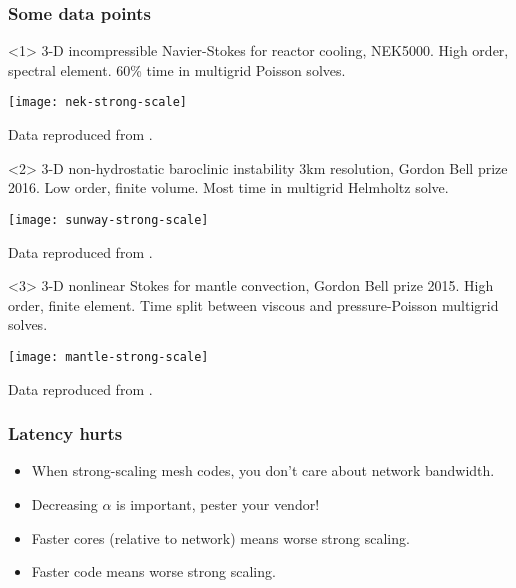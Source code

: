 \documentclass[presentation]{beamer}
\begin{document}
\begin{frame}
  \frametitle{Some data points}

  \begin{onlyenv}<1>
    3-D incompressible Navier-Stokes for reactor cooling, NEK5000.
    High order, spectral element.  60\% time in multigrid Poisson solves.

    \begin{center}
      \texttt{[image: nek-strong-scale]}

      Data reproduced from \textcite{Fischer:2015}.
    \end{center}
  \end{onlyenv}

  \begin{onlyenv}<2>
    3-D non-hydrostatic baroclinic instability 3km resolution, Gordon Bell prize
    2016.  Low order, finite volume. Most time in multigrid Helmholtz solve.
    \begin{center}
      \texttt{[image: sunway-strong-scale]}

      Data reproduced from \textcite{Yang:2016}.
    \end{center}
  \end{onlyenv}

  \begin{onlyenv}<3>
    3-D nonlinear Stokes for mantle convection, Gordon Bell prize
    2015.  High order, finite element.  Time split between viscous
    and pressure-Poisson multigrid solves.

    \begin{center}
      \texttt{[image: mantle-strong-scale]}

      Data reproduced from \textcite{Rudi:2015}.
    \end{center}    
  \end{onlyenv}
\end{frame}

\begin{frame}
  \frametitle{Latency hurts}

  \begin{itemize}
  \item When strong-scaling mesh codes, you don't care about network
    bandwidth.
  \item Decreasing $\alpha$ is important, pester your vendor!
  \item Faster cores (relative to network) means worse strong scaling.
  \item Faster code means worse strong scaling.
  \end{itemize}
\end{frame}
\end{document}
